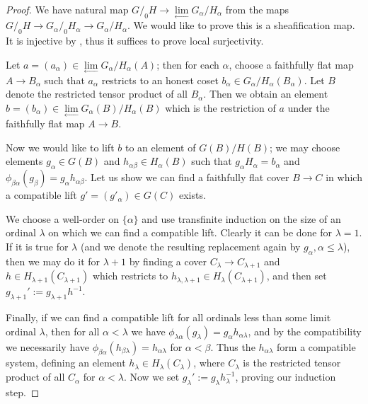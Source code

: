 \documentclass[11pt]{amsart}
\theoremstyle{definition}
\theoremstyle{remark}
\numberwithin{equation}{section}
\begin{document}
	
	\begin{proof}
		We have natural map $G/_0H\to\lim\limits_{\leftarrow}{G_{\alpha}/H_{\alpha}}$ from the maps $G/_0H\to G_{\alpha}/_0H_{\alpha}\to{G_{\alpha}/H_{\alpha}}$.  We would like to prove this is a sheafification map.  It is injective by \cite[\S 5.3]{CS}, thus it suffices to prove local surjectivity.
		
		Let $a=(a_{\alpha})\in \lim\limits_{\leftarrow}{G_{\alpha}/H_{\alpha}}(A)$; then for each $\alpha$, choose a faithfully flat map $A\to B_{\alpha}$ such that $a_{\alpha}$ restricts to an honest coset $b_{\alpha}\in G_{\alpha}/H_{\alpha}(B_{\alpha})$.  Let $B$ denote the restricted tensor product of all $B_{\alpha}$.  Then we obtain an element $b=(b_{\alpha})\in\lim\limits_{\leftarrow}G_{\alpha}(B)/H_{\alpha}(B)$ which is the restriction of $a$ under the  faithfully flat map $A\to B$.  
		
		Now we would like to lift $b$ to an element of $G(B)/H(B)$; we may choose elements $g_{\alpha}\in G(B)$ and $h_{\alpha\beta}\in H_{\alpha}(B)$ such that $g_{\alpha}H_{\alpha}=b_{\alpha}$ and $\phi_{\beta\alpha}(g_{\beta})=g_{\alpha}h_{\alpha\beta}$.  Let us show we can find a faithfully flat cover $B\to C$ in which a compatible lift $g'=(g'_{\alpha})\in G(C)$ exists.
		
		We choose a well-order on $\{\alpha\}$ and use transfinite induction on the size of an ordinal $\lambda$ on which we can find a compatible lift. Clearly it can be done for $\lambda=1$. If it is true for $\lambda$ (and we denote the resulting replacement again by $g_\alpha,\alpha\le\lambda$), then we may do it for $\lambda+1$ by finding a cover $C_{\lambda}\to C_{\lambda+1}$ and $h\in H_{\lambda+1}(C_{\lambda+1})$ which restricts to $h_{\lambda,\lambda+1}\in H_{\lambda}(C_{\lambda+1})$, and then set $g_{\lambda+1}':=g_{\lambda+1}h^{-1}$.  
		
		Finally, if we can find a compatible lift for all ordinals less than some limit ordinal $\lambda$, then for all $\alpha<\lambda$ we have $\phi_{\lambda\alpha}(g_{\lambda})=g_{\alpha}h_{\alpha\lambda}$, and by the compatibility we necessarily have $\phi_{\beta\alpha}(h_{\beta\lambda})=h_{\alpha\lambda}$ for $\alpha<\beta$.  Thus the $h_{\alpha\lambda}$ form a compatible system, defining an element $h_{\lambda}\in H_{\lambda}(C_{\lambda})$, where $C_{\lambda}$ is the restricted tensor product of all $C_{\alpha}$ for $\alpha<\lambda$.  Now we set $g_{\lambda}':=g_{\lambda}h_{\lambda}^{-1}$, proving our induction step.
	\end{proof}
	
\end{document}
